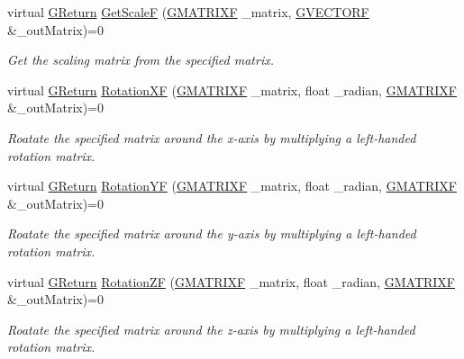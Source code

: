 \begin{DoxyCompactItemize}
virtual \mbox{\hyperlink{namespace_g_w_a67a839e3df7ea8a5c5686613a7a3de21}{G\+Return}} \mbox{\hyperlink{class_g_w_1_1_m_a_t_h_1_1_g_matrix_aaf1e6774edbb0d9e2b5074298bcae8dd}{Get\+ScaleF}} (\mbox{\hyperlink{struct_g_w_1_1_m_a_t_h_1_1_g_m_a_t_r_i_x_f}{G\+M\+A\+T\+R\+I\+XF}} \+\_\+matrix, \mbox{\hyperlink{struct_g_w_1_1_m_a_t_h_1_1_g_v_e_c_t_o_r_f}{G\+V\+E\+C\+T\+O\+RF}} \&\+\_\+out\+Matrix)=0
\begin{DoxyCompactList}\small\item\em Get the scaling matrix from the specified matrix. \end{DoxyCompactList}\item 
virtual \mbox{\hyperlink{namespace_g_w_a67a839e3df7ea8a5c5686613a7a3de21}{G\+Return}} \mbox{\hyperlink{class_g_w_1_1_m_a_t_h_1_1_g_matrix_acd8ef29804a2d807876b2f0a22a1f9b4}{Rotation\+XF}} (\mbox{\hyperlink{struct_g_w_1_1_m_a_t_h_1_1_g_m_a_t_r_i_x_f}{G\+M\+A\+T\+R\+I\+XF}} \+\_\+matrix, float \+\_\+radian, \mbox{\hyperlink{struct_g_w_1_1_m_a_t_h_1_1_g_m_a_t_r_i_x_f}{G\+M\+A\+T\+R\+I\+XF}} \&\+\_\+out\+Matrix)=0
\begin{DoxyCompactList}\small\item\em Roatate the specified matrix around the x-\/axis by multiplying a left-\/handed rotation matrix. \end{DoxyCompactList}\item 
virtual \mbox{\hyperlink{namespace_g_w_a67a839e3df7ea8a5c5686613a7a3de21}{G\+Return}} \mbox{\hyperlink{class_g_w_1_1_m_a_t_h_1_1_g_matrix_afe5fa5399691dc690272dad5d3697ff9}{Rotation\+YF}} (\mbox{\hyperlink{struct_g_w_1_1_m_a_t_h_1_1_g_m_a_t_r_i_x_f}{G\+M\+A\+T\+R\+I\+XF}} \+\_\+matrix, float \+\_\+radian, \mbox{\hyperlink{struct_g_w_1_1_m_a_t_h_1_1_g_m_a_t_r_i_x_f}{G\+M\+A\+T\+R\+I\+XF}} \&\+\_\+out\+Matrix)=0
\begin{DoxyCompactList}\small\item\em Roatate the specified matrix around the y-\/axis by multiplying a left-\/handed rotation matrix. \end{DoxyCompactList}\item 
virtual \mbox{\hyperlink{namespace_g_w_a67a839e3df7ea8a5c5686613a7a3de21}{G\+Return}} \mbox{\hyperlink{class_g_w_1_1_m_a_t_h_1_1_g_matrix_abce415225da8aa2592e1ef495fd9996b}{Rotation\+ZF}} (\mbox{\hyperlink{struct_g_w_1_1_m_a_t_h_1_1_g_m_a_t_r_i_x_f}{G\+M\+A\+T\+R\+I\+XF}} \+\_\+matrix, float \+\_\+radian, \mbox{\hyperlink{struct_g_w_1_1_m_a_t_h_1_1_g_m_a_t_r_i_x_f}{G\+M\+A\+T\+R\+I\+XF}} \&\+\_\+out\+Matrix)=0
\begin{DoxyCompactList}\small\item\em Roatate the specified matrix around the z-\/axis by multiplying a left-\/handed rotation matrix. \end{DoxyCompactList}\item 

\end{DoxyCompactItemize}
